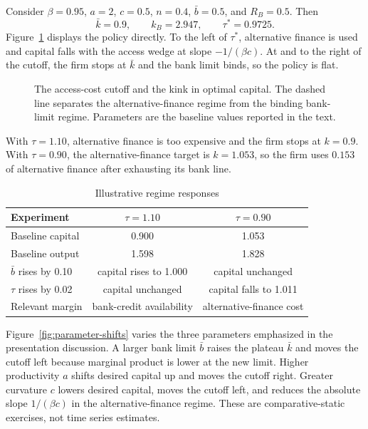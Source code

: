 \documentclass[11pt]{article}
\theoremstyle{definition}
\theoremstyle{remark}
\newcommand{\kb}{k_B}
\newcommand{\Rb}{R_B}
\begin{document}
Consider $\beta=0.95$, $a=2$, $c=0.5$, $n=0.4$,
$\bar b=0.5$, and $\Rb=0.5$. Then
\begin{equation}
\bar k=0.9,\qquad \kb=2.947,\qquad \tau^*=0.9725.
\end{equation}
Figure~\ref{fig:threshold-mechanics} displays the policy directly. To the left
of $\tau^*$, alternative finance is used and capital falls with the access
wedge at slope $-1/(\beta c)$. At and to the right of the cutoff, the firm stops
at $\bar k$ and the bank limit binds, so the policy is flat.

\begin{figure}[htbp]
\centering

\caption{The access-cost cutoff and the kink in optimal capital. The dashed
line separates the alternative-finance regime from the binding bank-limit
regime. Parameters are the baseline values reported in the text.}
\label{fig:threshold-mechanics}
\end{figure}

With $\tau=1.10$, alternative finance is too expensive and the firm stops at
$k=0.9$. With $\tau=0.90$, the alternative-finance target is $k=1.053$, so the
firm uses $0.153$ of alternative finance after exhausting its bank line.

\begin{table}[ht]
\centering
\caption{Illustrative regime responses}
\begin{tabular}{lcc}
\toprule
Experiment & $\tau=1.10$ & $\tau=0.90$\\
\midrule
Baseline capital & 0.900 & 1.053\\
Baseline output & 1.598 & 1.828\\
$\bar b$ rises by 0.10 & capital rises to 1.000 & capital unchanged\\
$\tau$ rises by 0.02 & capital unchanged & capital falls to 1.011\\
Relevant margin & bank-credit availability & alternative-finance cost\\
\bottomrule
\end{tabular}
\end{table}

Figure~\ref{fig:parameter-shifts} varies the three parameters emphasized in
the presentation discussion. A larger bank limit $\bar b$ raises the plateau
$\bar k$ and moves the cutoff left because marginal product is lower at the
new limit. Higher productivity $a$ shifts desired capital up and moves the
cutoff right. Greater curvature $c$ lowers desired capital, moves the cutoff
left, and reduces the absolute slope $1/(\beta c)$ in the
alternative-finance regime. These are comparative-static exercises, not time
series estimates.
\end{document}

